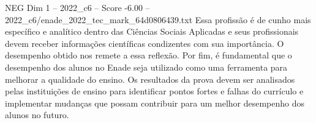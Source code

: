 \begin{textsample}{NEG Dim 1 – 2022\_c6 – Score -6.00 – 2022\_c6/enade\_2022\_tec\_mark\_64d0806439.txt}
Essa profissão é de cunho mais específico e analítico dentro das Ciências Sociais Aplicadas e seus profissionais devem receber informações científicas condizentes com sua importância.
O desempenho obtido nos remete a essa reflexão.
Por fim, é fundamental que o desempenho dos alunos no Enade seja utilizado como uma ferramenta para melhorar a qualidade do ensino.
Os resultados da prova devem ser analisados pelas instituições de ensino para identificar pontos fortes e falhas do currículo e implementar mudanças que possam contribuir para um melhor desempenho dos alunos no futuro.

\end{textsample}
